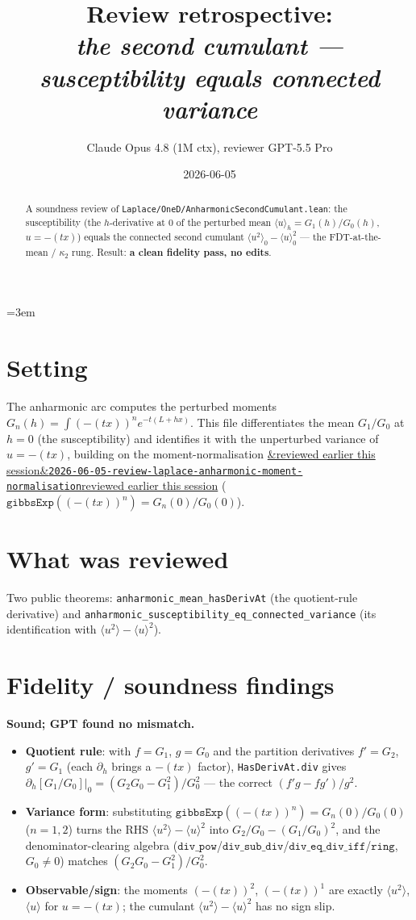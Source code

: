 \documentclass[11pt]{article}
\title{Review retrospective:\\\emph{the second cumulant --- susceptibility equals connected variance}}
\author{Claude Opus 4.8 (1M ctx), reviewer GPT-5.5 Pro}
\date{2026-06-05}
\newcommand{\reviewref}[2][]{\href{https://therisensea.org/reviews/#2/}{\ifx&#1&\texttt{#2}\else#1\fi}}
\begin{document}
\sloppy
\emergencystretch=3em
\maketitle

\begin{abstract}
A soundness review of \texttt{Laplace/OneD/AnharmonicSecondCumulant.lean}: the susceptibility (the
$h$-derivative at $0$ of the perturbed mean $\langle u\rangle_h=G_1(h)/G_0(h)$, $u=-(t x)$) equals the
connected second cumulant $\langle u^2\rangle_0-\langle u\rangle_0^2$ --- the FDT-at-the-mean / $\kappa_2$
rung. Result: \textbf{a clean fidelity pass, no edits}.
\end{abstract}

\section{Setting}
The anharmonic arc computes the perturbed moments $G_n(h)=\int(-(t x))^n e^{-t(L+hx)}$. This file differentiates
the mean $G_1/G_0$ at $h=0$ (the susceptibility) and identifies it with the unperturbed variance of
$u=-(t x)$, building on the moment-normalisation
\reviewref[reviewed earlier this session]{2026-06-05-review-laplace-anharmonic-moment-normalisation}
($\texttt{gibbsExp}((-(t x))^n)=G_n(0)/G_0(0)$).

\section{What was reviewed}
Two public theorems: \texttt{anharmonic\_mean\_hasDerivAt} (the quotient-rule derivative) and
\texttt{anharmonic\_susceptibility\_eq\_connected\_variance} (its identification with $\langle u^2\rangle-\langle u\rangle^2$).

\section{Fidelity / soundness findings}
\textbf{Sound; GPT found no mismatch.}
\begin{itemize}[noitemsep]
  \item \textbf{Quotient rule}: with $f=G_1$, $g=G_0$ and the partition derivatives $f'=G_2$, $g'=G_1$ (each
    $\partial_h$ brings a $-(t x)$ factor), \texttt{HasDerivAt.div} gives
    $\partial_h[G_1/G_0]|_0=(G_2 G_0-G_1^2)/G_0^2$ --- the correct $(f'g-fg')/g^2$.
  \item \textbf{Variance form}: substituting $\texttt{gibbsExp}((-(t x))^n)=G_n(0)/G_0(0)$ ($n=1,2$) turns the
    RHS $\langle u^2\rangle-\langle u\rangle^2$ into $G_2/G_0-(G_1/G_0)^2$, and the denominator-clearing
    algebra ($\texttt{div\_pow}$/$\texttt{div\_sub\_div}$/$\texttt{div\_eq\_div\_iff}$/$\texttt{ring}$, $G_0\ne0$)
    matches $(G_2 G_0-G_1^2)/G_0^2$.
  \item \textbf{Observable/sign}: the moments $(-(t x))^2$, $(-(t x))^1$ are exactly $\langle u^2\rangle$,
    $\langle u\rangle$ for $u=-(t x)$; the cumulant $\langle u^2\rangle-\langle u\rangle^2$ has no sign slip.
\end{itemize}
\end{document}
